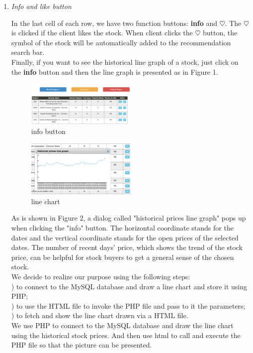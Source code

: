 \documentclass[10pt, conference, compsocconf]{IEEEtran}
\begin{document}
\begin{enumerate}[label=\Alph*]
    
      \item  \textit{Info and like button}
      
   In the last cell of each row, we have two function buttons: \textbf{info} and $\heartsuit$. 
   The $\heartsuit$ is clicked if the client likes the stock. When client clicks the $\heartsuit$  button, the symbol of the stock will be automatically added to the recommendation search bar.\\
    Finally, if you want to see the historical line graph of a stock, just click on the \textbf{info} button and then the line graph is presented as in Figure 1.

 \begin{figure}[!h]
            \centering
           \includegraphics[width=0.5\textwidth]{figures/info_button.png}
           \caption{info button}
          \vspace{0.1cm}
 \end{figure}
 
 \begin{figure}[!h]
            \centering
           \includegraphics[width=0.5\textwidth]{figures/line_chart.png}
           \caption{line chart}
          \vspace{0.1cm}
 \end{figure}

As is shown in Figure 2, a dialog called "historical prices line graph" pops up when clicking the "info" button. The horizontal coordinate stands for the dates and the vertical coordinate stands for the open prices of the selected dates. The number of recent days' price, which shows the trend of the stock price, can be helpful for stock buyers to get a general sense of the chosen stock.\\


We decide to realize our purpose using the following steps: \\
) to connect to the  MySQL database and draw a line chart and store it using PHP; \\
) to use the HTML file to invoke the PHP file and pass to it the parameters; \\
) to fetch and show the line chart drawn via a HTML file. \\
\indent We use PHP to connect to the MySQL database and draw the line chart using the historical stock prices. And then use html to call and execute the PHP file so that the picture can be presented.



\end{enumerate}
\end{document}
